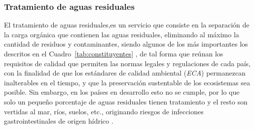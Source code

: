 \begin{small}
\begin{description}
\end{description}
\end{small}

\subsubsection*{Tratamiento de aguas residuales}
El tratamiento de aguas residuales,es un servicio que consiste en la separación de la carga orgánica que contienen las aguas residuales, eliminando al máximo la cantidad de residuos y contaminantes, siendo algunos de los más importantes los descritos en el Cuadro~\ref{tab:constituyentes} \emph{\citep{tratGOB, ron}}, de tal forma que reúnan los requisitos de calidad que permiten las normas legales y regulaciones de cada país, con la finalidad de que los estándares de calidad ambiental (\emph{ECA}) permanezcan inalterables en el tiempo, y que la preservación sustentable de los ecosistemas sea posible. Sin embargo, en los países en desarrollo esto no se cumple, por lo que solo un pequeño porcentaje de aguas residuales tienen tratamiento y el resto son vertidas al mar, ríos, suelos, etc., originando riesgos de infecciones gastrointestinales de origen hídrico \emph{\citep{carreno17}}.\\
